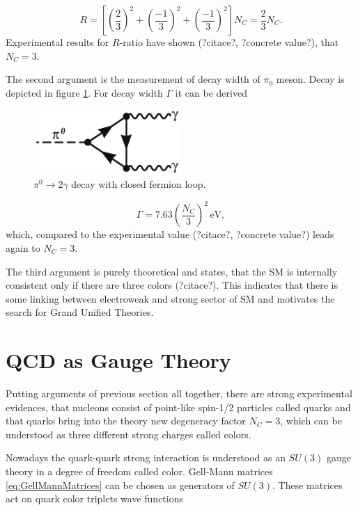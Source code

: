 \documentclass[a4paper,11pt]{report}
\begin{document}
\begin{equation}
  R = \left[ \left( \frac{2}{3} \right)^2 +
    \left( \frac{-1}{3} \right)^2 +
  \left( \frac{-1}{3} \right)^2 \right] N_C = \frac{2}{3}N_C.
  \label{eq:NumberOfColorsSubstitued}
\end{equation}
Experimental results for $R$-ratio have shown (?citace?, ?concrete value?), that
$N_C = 3$.

The second argument is the measurement of decay width of $\pi_0$ meson. Decay is
depicted in figure \ref{fig:PiDecay}. For decay width $\Gamma$ it can be derived 

\begin{figure}[t]
  \centering
  \includegraphics[width=0.5\textwidth]{Chapter1/PiMesonDecay.png} 
  \caption{$\pi^0 \rightarrow 2 \gamma$ decay with closed fermion loop.}
  \label{fig:PiDecay}
\end{figure}

\begin{equation}
  \Gamma = 7.63 \left( \frac{N_C}{3} \right)^2 \, \text{eV},
  \label{ex:PiMesonDecayWidth}
\end{equation}
which, compared to the experimental value (?citace?, ?concrete value?) leads
again to $N_C=3$.

The third argument is purely theoretical and states, that the SM is internally
consistent only if there are three colors (?citace?). This indicates that there
is some linking between electroweak and strong sector of SM and motivates the
search for Grand Unified Theories.

\section{QCD as Gauge Theory}

Putting arguments of previous section all together, there are strong
experimental evidences, that nucleons consist of point-like spin-1/2 particles
called quarks and that quarks bring into the theory new degeneracy factor $N_C =
3$, which can be understood as three different strong charges called colors.

Nowadays the quark-quark strong interaction is understood as an $SU(3)$ gauge theory in
a degree of freedom called color. Gell-Mann matrices \eqref{eq:GellMannMatrices}
can be chosen as generators of $SU(3)$. These matrices act on quark color
triplets wave functions
\end{document}
